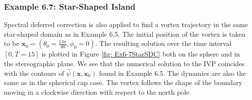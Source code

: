 \documentclass{sfuthesis}
\begin{document}

\subsubsection{Example 6.7: Star-Shaped Island}
Spectral deferred correction is also applied to find a vortex trajectory in the same star-shaped domain as in Example 6.5. The initial position of the vortex is taken to be $\mathbf{x}_0=(\theta_0=\frac{13\pi}{40}, \phi_0=0)$. The resulting solution over the time interval $[0,T=15]$ is plotted in Figure \ref{fig: Ex6-7StarSDC} both on the sphere and in the stereographic plane. We see that the numerical solution to the IVP coincides with the contours of $\hat{\psi}(\mathbf{x}, \mathbf{x}_0)$ found in Example 6.5. The dynamics are also the same as in the spherical cap case. The vortex follows the shape of the boundary moving in a clockwise direction with respect to the north pole. 
\end{document}
